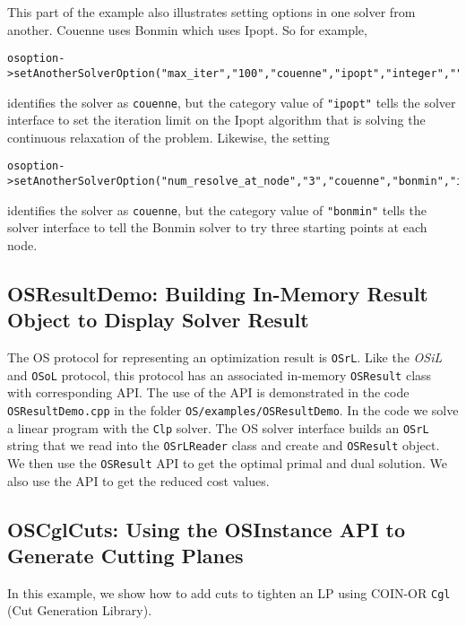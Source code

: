 \documentclass[11pt]{article}
\renewcommand{\_}{{\char"5F}}
\renewcommand{\{}{{\char"7B}}
\renewcommand{\}}{{\char"7D}}
\renewcommand{\^}{{\char"0D}}
\renewcommand{\'}{{\char"0D}}
\begin{document}
This part of the example also illustrates setting options in one solver from another. 
Couenne uses Bonmin which uses Ipopt.  So for example,

\begin{verbatim}
osoption->setAnotherSolverOption("max_iter","100","couenne","ipopt","integer","");
\end{verbatim}
identifies the solver as {\tt couenne}, but the category value of {\tt "ipopt"}  tells the solver 
interface to set the iteration limit on the Ipopt algorithm that is solving the continuous relaxation 
of the problem.  Likewise, the setting
\begin{verbatim}
osoption->setAnotherSolverOption("num_resolve_at_node","3","couenne","bonmin","integer","");
\end{verbatim}
identifies the solver as {\tt couenne}, but the category value of {\tt "bonmin"}  tells the solver 
interface to tell the Bonmin solver to try three starting points at each node. 

 

\subsection{OSResultDemo: Building In-Memory Result Object to Display Solver Result}\label{section:exampleOSResultDemo}

The OS protocol for representing an optimization result is {\tt OSrL}. Like the {\it OSiL} and {\tt OSoL} protocol, this protocol has an associated in-memory {\tt OSResult} class with corresponding API.  The use of the API is demonstrated in the code {\tt OSResultDemo.cpp} in the folder {\tt OS/examples/OSResultDemo}.  In the code we solve a linear program with the {\tt Clp} solver.  The OS solver interface builds an {\tt OSrL} string that we read into the {\tt OSrLReader} class and create and {\tt OSResult} object. We then use the {\tt OSResult} API to get the optimal primal and dual solution. We also use the API to get the reduced cost values. 


\subsection{OSCglCuts: Using the OSInstance API to Generate Cutting Planes}\label{section:exampleOSAddCuts}

In this example, we show how to add cuts to tighten an LP using COIN-OR  {\tt Cgl} (Cut Generation Library).
\end{document}
